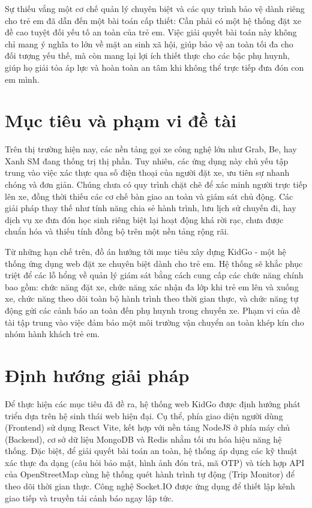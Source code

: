 \documentclass[../DoAn.tex]{subfiles}
\begin{document}
Sự thiếu vắng một cơ chế quản lý chuyên biệt và các quy trình bảo vệ dành riêng cho trẻ em đã dẫn đến một bài toán cấp thiết: Cần phải có một hệ thống đặt xe đề cao tuyệt đối yếu tố an toàn của trẻ em. Việc giải quyết bài toán này không chỉ mang ý nghĩa to lớn về mặt an sinh xã hội, giúp bảo vệ an toàn tối đa cho đối tượng yếu thế, mà còn mang lại lợi ích thiết thực cho các bậc phụ huynh, giúp họ giải tỏa áp lực và hoàn toàn an tâm khi không thể trực tiếp đưa đón con em mình.

\section{Mục tiêu và phạm vi đề tài}
\label{section:1.2}
Trên thị trường hiện nay, các nền tảng gọi xe công nghệ lớn như Grab, Be, hay Xanh SM đang thống trị thị phần. Tuy nhiên, các ứng dụng này chủ yếu tập trung vào việc xác thực qua số điện thoại của người đặt xe, ưu tiên sự nhanh chóng và đơn giản. Chúng chưa có quy trình chặt chẽ để xác minh người trực tiếp lên xe, đồng thời thiếu các cơ chế bàn giao an toàn và giám sát chủ động. Các giải pháp thay thế như tính năng chia sẻ hành trình, lưu lịch sử chuyến đi, hay dịch vụ xe đưa đón học sinh riêng biệt lại hoạt động khá rời rạc, chưa được chuẩn hóa và thiếu tính đồng bộ trên một nền tảng rộng rãi.

Từ những hạn chế trên, đồ án hướng tới mục tiêu xây dựng KidGo - một hệ thống ứng dụng web đặt xe chuyên biệt dành cho trẻ em. Hệ thống sẽ khắc phục triệt để các lỗ hổng về quản lý giám sát bằng cách cung cấp các chức năng chính bao gồm: chức năng đặt xe, chức năng xác nhận đa lớp khi trẻ em lên và xuống xe, chức năng theo dõi toàn bộ hành trình theo thời gian thực, và chức năng tự động gửi các cảnh báo an toàn đến phụ huynh trong chuyến xe. Phạm vi của đề tài tập trung vào việc đảm bảo một môi trường vận chuyển an toàn khép kín cho nhóm hành khách trẻ em.

\section{Định hướng giải pháp}
\label{section:1.3}
Để thực hiện các mục tiêu đã đề ra, hệ thống web KidGo được định hướng phát triển dựa trên hệ sinh thái web hiện đại. Cụ thể, phía giao diện người dùng (Frontend) sử dụng React Vite, kết hợp với nền tảng NodeJS ở phía máy chủ (Backend), cơ sở dữ liệu MongoDB và Redis nhằm tối ưu hóa hiệu năng hệ thống. Đặc biệt, để giải quyết bài toán an toàn, hệ thống áp dụng các kỹ thuật xác thực đa dạng (câu hỏi bảo mật, hình ảnh đón trả, mã OTP) và tích hợp API của OpenStreetMap cùng hệ thống quét hành trình tự động (Trip Monitor) để theo dõi thời gian thực. Công nghệ Socket.IO được ứng dụng để thiết lập kênh giao tiếp và truyền tải cảnh báo ngay lập tức.
\end{document}
